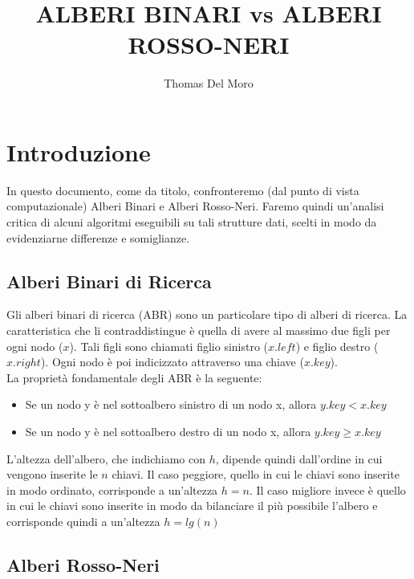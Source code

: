 \documentclass{article}
\title{ALBERI BINARI vs ALBERI ROSSO-NERI}
\author{Thomas Del Moro}
\begin{document}
\maketitle

\section{Introduzione}

In questo documento, come da titolo, confronteremo (dal punto di vista computazionale) Alberi Binari e Alberi Rosso-Neri. Faremo quindi un'analisi critica di alcuni algoritmi eseguibili su tali strutture dati, scelti in modo da evidenziarne differenze e somiglianze.

\subsection{Alberi Binari di Ricerca}

Gli alberi binari di ricerca (ABR) sono un particolare tipo di alberi di ricerca. La caratteristica che li contraddistingue è quella di avere al massimo due figli per ogni nodo ($x$). Tali figli sono chiamati figlio sinistro ($x.left$) e figlio destro ($x.right$). Ogni nodo è poi indicizzato attraverso una chiave ($x.key$).\\
La proprietà fondamentale degli ABR è la seguente:
\begin{itemize}
\item Se un nodo y è nel sottoalbero sinistro di un nodo x, allora $y.key < x.key$
\item Se un nodo y è nel sottoalbero destro di un nodo x, allora $y.key \geq x.key$
\end{itemize}
L'altezza dell'albero, che indichiamo con $h$, dipende quindi dall'ordine in cui vengono inserite le $n$ chiavi. Il caso peggiore, quello in cui le chiavi sono inserite in modo ordinato, corrisponde a un'altezza $h = n$. Il caso migliore invece è quello in cui le chiavi sono inserite in modo da bilanciare il più possibile l'albero e corrisponde quindi a un'altezza $h = lg(n)$

\subsection{Alberi Rosso-Neri}
\end{document}
